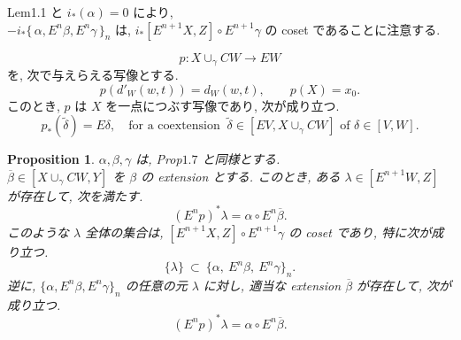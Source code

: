 \documentclass[12pt, leqno]{ltjsarticle}
\newcommand{\Ex}{E}        %
\newcommand{\todai}[2][]{\{\,#2\,\}_{#1}}      %
\numberwithin{equation}{section}
\theoremstyle{plain}
\newtheorem{proposition}[theorem]{Proposition}
\theoremstyle{definition}
\theoremstyle{remark}
\begin{document}
\medskip

Lem1.1 と \(i_*(\alpha) = 0\) により,\\
\(-i_*\todai[n]{\alpha, E^n\beta, E^n\gamma}\) は, 
\(i_*[E^{n+1}X, Z]\circ E^{n+1}\gamma\)
の coset であることに注意する.

\begin{equation}\label{eq:p-def}
p:X\cup_\gamma CW\to EW
\end{equation}
を, 次で与えらえる写像とする.
\[
p(d'_W(w, t)) = d_W(w, t),\qquad
p(X) = x_0.
\]
このとき,
\(p\) は \(X\) を一点につぶす写像であり, 次が成り立つ.
\begin{equation}\label{eq:p-star}
p_*(\widetilde{\delta})=E\delta,
\quad\text{for a coextension }\ 
\widetilde{\delta}\in[EV, X\cup_\gamma CW]
\text{ of }\delta\in[V, W].
\end{equation}

\begin{proposition}\label{prop:1-9}
$\alpha,\beta,\gamma$ は, Prop$1.7$ と同様とする. \\
$\overline\beta\in[X\cup_\gamma CW, Y]$ を $\beta$ の \emph{extension} とする. 
このとき,
ある $\lambda\in[\Ex^{n+1}W, Z]$ が存在して, 次を満たす.
\[
(\Ex^n p)^*\lambda=\alpha\circ \Ex^n\overline\beta.
\]
このような $\lambda$ 全体の集合は,
\(
[\Ex^{n+1}X, Z]\circ \Ex^{n+1}\gamma
\)
の coset であり, 特に次が成り立つ.
\[
\{\lambda\}\ \subset\ \{\alpha,\ \Ex^n\beta,\ \Ex^n\gamma\}_n .
\]
逆に, $\{\alpha,\Ex^n\beta,\Ex^n\gamma\}_n$ の任意の元 $\lambda$ に対し, 
適当な extension $\overline\beta$ が存在して,
次が成り立つ.
\[
(\Ex^n p)^*\lambda=\alpha\circ \Ex^n\overline\beta.
\]
\end{proposition}
\end{document}
